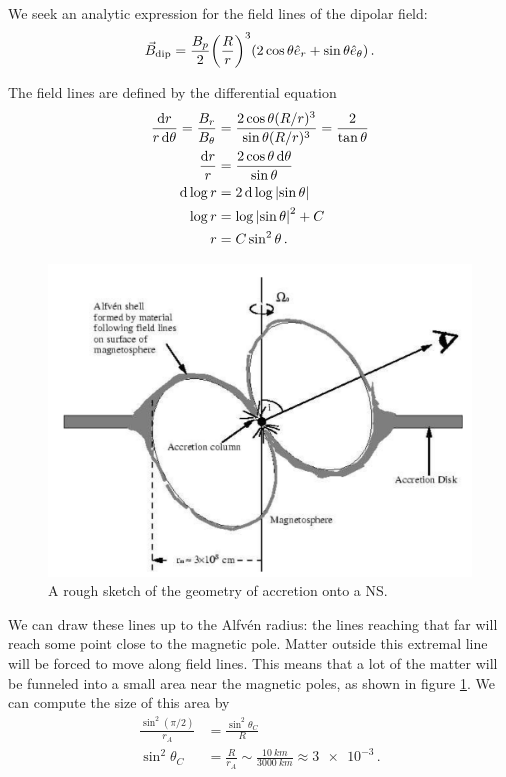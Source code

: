 \documentclass[main.tex]{subfiles}
\begin{document}

We seek an analytic expression for the field lines of the dipolar field: 
%
\begin{align}
\vec{B} _{\text{dip}} = \frac{B_p}{2} \qty( \frac{R}{r})^3 \qty(2 \cos \theta \hat{e}_r + \sin \theta \hat{e}_\theta )
\,.
\end{align}

The field lines are defined by the differential equation 
%
\begin{align}
\frac{ \dd{r}}{ r \dd{\theta }} = \frac{B_r}{B_\theta } &= \frac{ 2\cos \theta ( R / r )^3}{\sin \theta  (R / r)^3} = \frac{2}{\tan \theta }  \\
\frac{\dd{r}}{r} &= \frac{2 \cos \theta \dd{\theta }}{\sin \theta }  \\
\dd{\log r} &= 2 \dd{\log \abs{\sin \theta }}  \\
\log r &= \log \abs{\sin \theta }^2 + C  \\
r &= C \sin^2 \theta
\,.
\end{align}

\begin{figure}[]
\centering
\includegraphics[width=\textwidth]{figures/alfven-accretion}
\caption{A rough sketch of the geometry of accretion onto a NS.}
\label{fig:alfven-accretion}
\end{figure}

We can draw these lines up to the Alfvén radius: the lines reaching that far will reach some point close to the magnetic pole. 
Matter outside this extremal line will be forced to move along field lines.
This means that a lot of the matter will be funneled into a small area near the magnetic poles, as shown in figure \ref{fig:alfven-accretion}. We can compute the size of this area by 
%
\begin{align}
\frac{\sin^2  (\pi / 2)}{r_A} &= \frac{\sin^2\theta_C}{R}  \\
\sin^2 \theta _C & = \frac{R}{r_A} \sim \frac{\SI{10}{km}}{\SI{3000}{km}} \approx \num{3e-3}
\,.
\end{align}
\end{document}
